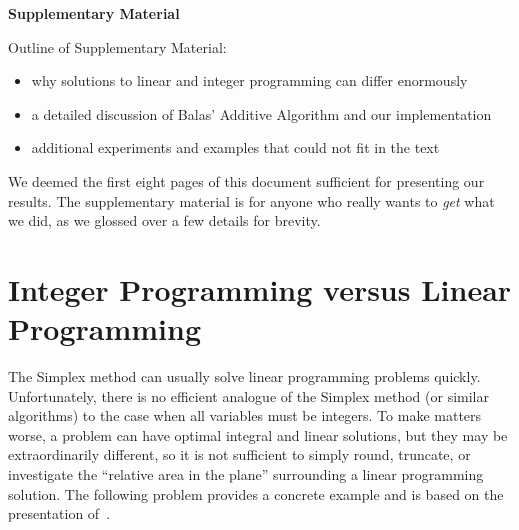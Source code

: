 \documentclass{article}
\begin{document}
\appendix

\begin{center}
{\Large \textbf{Supplementary Material}}
\end{center}

Outline of Supplementary Material:

\begin{itemize}[noitemsep]
    \item why solutions to linear and integer programming can differ enormously
    \item a detailed discussion of Balas' Additive Algorithm and our implementation
    \item additional experiments and examples that could not fit in the text
\end{itemize}

We deemed the first eight pages of this document sufficient for presenting our results. The supplementary material is for anyone who really wants to
\emph{get} what we did, as we glossed over a few details for brevity.

\section{Integer Programming versus Linear Programming}\label{app:lin_vs_int}

The Simplex method can usually solve linear programming problems quickly. Unfortunately, there is no efficient analogue of the Simplex method (or
similar algorithms) to the case when all variables must be integers. To make matters worse, a problem can have optimal integral and linear solutions,
but they may be extraordinarily different, so it is not sufficient to simply round, truncate, or investigate the ``relative area in the plane''
surrounding a linear programming solution. The following problem provides a concrete example and is based on the presentation of~\cite{stevenmiller}.
\end{document}
